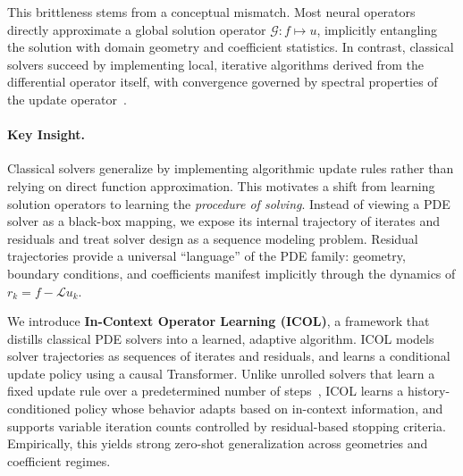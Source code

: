 \documentclass{article}
\begin{document}
This brittleness stems from a conceptual mismatch. Most neural operators directly approximate a global solution operator $\mathcal{G}: f \mapsto u$, implicitly entangling the solution with domain geometry and coefficient statistics. In contrast, classical solvers succeed by implementing local, iterative algorithms derived from the differential operator itself, with convergence governed by spectral properties of the update operator~\cite{saad2003iterative,trefethen1997pseudospectra}.

\paragraph{Key Insight.}
Classical solvers generalize by implementing algorithmic update rules rather than relying on direct function approximation. This motivates a shift from learning solution operators to learning the \emph{procedure of solving}. Instead of viewing a PDE solver as a black-box mapping, we expose its internal trajectory of iterates and residuals and treat solver design as a sequence modeling problem. Residual trajectories provide a universal ``language'' of the PDE family: geometry, boundary conditions, and coefficients manifest implicitly through the dynamics of $r_k = f - \mathcal{L}u_k$.

We introduce \textbf{In-Context Operator Learning (ICOL)}, a framework that distills classical PDE solvers into a learned, adaptive algorithm. ICOL models solver trajectories as sequences of iterates and residuals, and learns a conditional update policy using a causal Transformer. Unlike unrolled solvers that learn a fixed update rule over a predetermined number of steps~\cite{li2020neuralpde,hoyer2023learning}, ICOL learns a history-conditioned policy whose behavior adapts based on in-context information, and supports variable iteration counts controlled by residual-based stopping criteria. Empirically, this yields strong zero-shot generalization across geometries and coefficient regimes.
\end{document}
